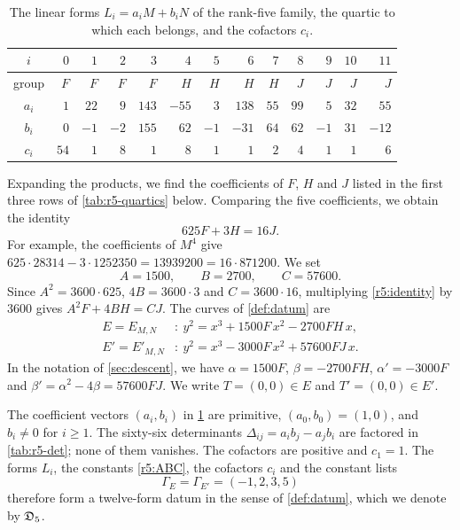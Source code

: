 \begin{table}[htbp]
\centering
\caption{The linear forms $L_i=a_iM+b_iN$ of the rank-five family, the quartic to which each belongs, and the cofactors $c_i$.}\label{tab:r5-data}
\begin{tabular}{c*{12}{r}}
\toprule
$i$ & $0$ & $1$ & $2$ & $3$ & $4$ & $5$ & $6$ & $7$ & $8$ & $9$ & $10$ & $11$\\
\midrule
group & $F$ & $F$ & $F$ & $F$ & $H$ & $H$ & $H$ & $H$ & $J$ & $J$ & $J$ & $J$\\
$a_i$ & $1$ & $22$ & $9$ & $143$ & $-55$ & $3$ & $138$ & $55$ & $99$ & $5$ & $32$ & $55$\\
$b_i$ & $0$ & $-1$ & $-2$ & $155$ & $62$ & $-1$ & $-31$ & $64$ & $62$ & $-1$ & $31$ & $-12$\\
$c_i$ & $54$ & $1$ & $8$ & $1$ & $8$ & $1$ & $1$ & $2$ & $4$ & $1$ & $1$ & $6$\\
\bottomrule
\end{tabular}
\end{table}

Expanding the products, we find the coefficients of $F$, $H$ and $J$ listed in the first three rows of \cref{tab:r5-quartics} below. Comparing the five coefficients, we obtain the identity
\begin{equation}\label{r5:identity}
625F+3H=16J.
\end{equation}
For example, the coefficients of $M^4$ give $625\cdot28314-3\cdot1252350=13939200=16\cdot871200$. We set
\begin{equation}\label{r5:ABC}
A=1500,\qquad B=2700,\qquad C=57600.
\end{equation}
Since $A^2=3600\cdot625$, $4B=3600\cdot3$ and $C=3600\cdot16$, multiplying \eqref{r5:identity} by $3600$ gives $A^2F+4BH=CJ$. The curves of \cref{def:datum} are
\begin{equation}\label{r5:curves}
\begin{aligned}
E=E_{M,N}&:\ y^2=x^3+1500F\,x^2-2700FH\,x,\\
E'=E'_{M,N}&:\ y^2=x^3-3000F\,x^2+57600FJ\,x.
\end{aligned}
\end{equation}
In the notation of \cref{sec:descent}, we have $\alpha=1500F$, $\beta=-2700FH$, $\alpha'=-3000F$ and $\beta'=\alpha^2-4\beta=57600FJ$. We write $T=(0,0)\in E$ and $T'=(0,0)\in E'$.

The coefficient vectors $(a_i,b_i)$ in \cref{tab:r5-data} are primitive, $(a_0,b_0)=(1,0)$, and $b_i\ne0$ for $i\ge1$. The sixty-six determinants $\Delta_{ij}=a_ib_j-a_jb_i$ are factored in \cref{tab:r5-det}; none of them vanishes. The cofactors are positive and $c_1=1$. The forms $L_i$, the constants \eqref{r5:ABC}, the cofactors $c_i$ and the constant lists
\begin{equation}\label{r5:Gamma}
\Gamma_E=\Gamma_{E'}=(-1,2,3,5)
\end{equation}
therefore form a twelve-form datum in the sense of \cref{def:datum}, which we denote by $\mathfrak D_5$.

